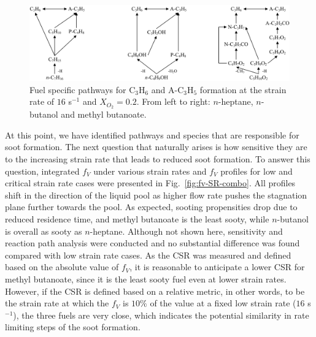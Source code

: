 \documentclass[preprint,3p,times,twocolumn]{elsarticleUS}
\begin{document}
\begin{figure}[h]
  \centering
  \scriptsize
  \includegraphics[width=1.0\textwidth]{Pathways_Fuel.png}
  \normalsize
  \caption{Fuel specific pathways for C$_3$H$_6$ and A-C$_3$H$_5$ formation at the strain rate of $16$ s$^{-1}$ and $X_{O_2}=0.2$. From left to right: $n$-heptane, $n$-butanol and methyl butanoate.}
  \label{fig:Pathways_Fuel}
\end{figure}
At this point, we have identified pathways and species that are responsible for soot formation. The next question that naturally arises is how sensitive they are to the increasing strain rate that leads to reduced soot formation. To answer this question, integrated $f_V$ under various strain rates and $f_V$ profiles for low and critical strain rate cases were presented in Fig.~\ref{fig:fv-SR-combo}. All profiles shift in the direction of the liquid pool as higher flow rate pushes the stagnation plane further towards the pool. As expected, sooting propensities drop due to reduced residence time, and methyl butanoate is the least sooty, while $n$-butanol is overall as sooty as $n$-heptane. Although not shown here, sensitivity and reaction path analysis were conducted and no substantial difference was found compared with low strain rate cases. As the CSR was measured and defined based on the absolute value of $f_V$, it is reasonable to anticipate a lower CSR for methyl butanoate, since it is the least sooty fuel even at lower strain rates. However, if the CSR is defined based on a relative metric, in other words, to be the strain rate at which the $f_V$ is $10\%$ of the value at a fixed low strain rate ($16$ s$^{-1}$), the three fuels are very close, which indicates the potential similarity in rate limiting steps of the soot formation.
\end{document}
